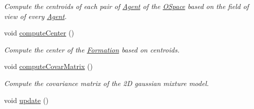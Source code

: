 \begin{DoxyCompactItemize}
\begin{DoxyCompactList}\small\item\em Compute the centroids of each pair of \hyperlink{classAgent}{Agent} of the \hyperlink{classOSpace}{O\+Space} based on the field of view of every \hyperlink{classAgent}{Agent}. \end{DoxyCompactList}\item 
void \hyperlink{classOSpace_a2cc6d61b727df4a7e763a38f10183463}{compute\+Center} ()\hypertarget{classOSpace_a2cc6d61b727df4a7e763a38f10183463}{}\label{classOSpace_a2cc6d61b727df4a7e763a38f10183463}

\begin{DoxyCompactList}\small\item\em Compute the center of the \hyperlink{classFormation}{Formation} based on centroids. \end{DoxyCompactList}\item 
void \hyperlink{classOSpace_af73e9e5f18635010d63bf1cfcbc05f1c}{compute\+Covar\+Matrix} ()
\begin{DoxyCompactList}\small\item\em Compute the covariance matrix of the 2D gaussian mixture model. \end{DoxyCompactList}\item 
void \hyperlink{classOSpace_ac87ea026f6b4b6d00980e7f849e48e9b}{update} ()\hypertarget{classOSpace_ac87ea026f6b4b6d00980e7f849e48e9b}{}\label{classOSpace_ac87ea026f6b4b6d00980e7f849e48e9b}


\end{DoxyCompactItemize}
